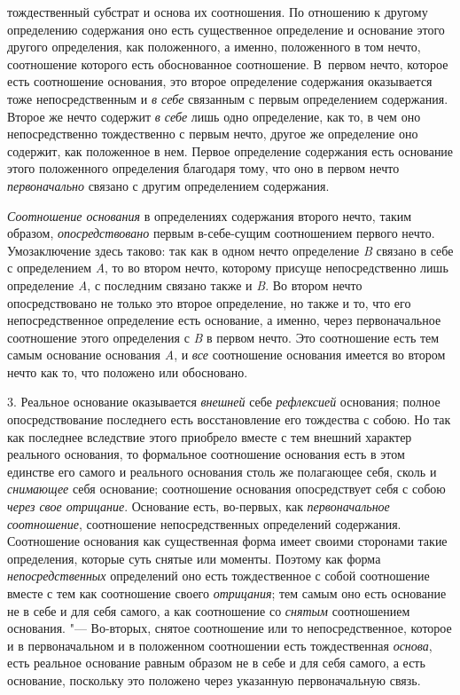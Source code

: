 тождественный субстрат и основа их соотношения. По отношению к другому
определению содержания оно есть существенное определение и основание этого
другого определения, как положенного, а именно, положенного в том нечто,
соотношение которого есть обоснованное соотношение. В~первом нечто, которое
есть соотношение основания, это второе определение содержания оказывается
тоже непосредственным и {\em в себе} связанным с первым
определением содержания. Второе же нечто содержит
{\em в себе} лишь одно определение, как то, в чем оно
непосредственно тождественно с первым нечто, другое же определение оно
содержит, как положенное в нем. Первое определение содержания есть
основание этого положенного определения благодаря тому, что оно в первом
нечто {\em первоначально} связано с другим определением
содержания.

{\em Соотношение основания} в определениях содержания
второго нечто, таким образом, {\em опосредствовано}
первым в-себе-сущим соотношением первого нечто. Умозаключение здесь таково:
так как в одном нечто определение {\em B} связано в
себе с определением {\em A}, то во втором нечто,
которому присуще непосредственно лишь определение
{\em A}, с последним связано также и
{\em B}. Во втором нечто опосредствовано не только это
второе определение, но также и то, что его непосредственное определение
есть основание, а именно, через первоначальное соотношение этого
определения с {\em B} в первом нечто. Это соотношение
есть тем самым основание основания {\em A}, и
{\em все} соотношение основания имеется во втором нечто
как то, что положено или обосновано.

3. Реальное основание оказывается {\em внешней} себе
{\em рефлексией} основания; полное опосредствование
последнего есть восстановление его тождества с собою. Но так как последнее
вследствие этого приобрело вместе с тем внешний характер реального
основания, то формальное соотношение основания есть в этом единстве его
самого и реального основания столь же полагающее себя, сколь и
{\em снимающее} себя основание; соотношение основания
опосредствует себя с собою {\em через свое отрицание}.
Основание есть, во-первых, как {\em первоначальное
}{\em соотношение}, соотношение непосредственных
определений содержания. Соотношение основания как существенная форма имеет
своими сторонами такие определения, которые суть снятые или моменты.
Поэтому как форма {\em непосредственных} определений
оно есть тождественное с собой соотношение вместе с тем как соотношение
своего {\em отрицания}; тем самым оно есть основание не
в себе и для себя самого, а как соотношение со
{\em снятым} соотношением основания. "--- Во-вторых,
снятое соотношение или то непосредственное, которое и в первоначальном и в
положенном соотношении есть тождественная {\em основа},
есть реальное основание равным образом не в себе и для себя самого, а есть
основание, поскольку это положено через указанную первоначальную связь.

